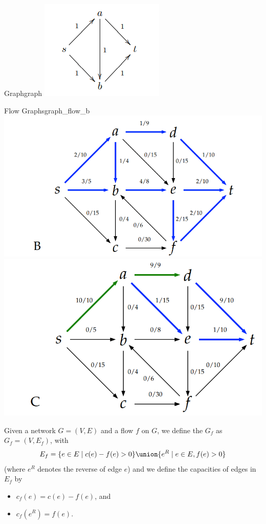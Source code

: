 \documentclass{tufte-handout}
\begin{document}
\begin{questions}
\begin{model}{Graph}{graph}
\includegraphics{Flow_POGIL_1.png}
\label{graph1}
\end{model}

\begin{model}{Flow Graphs}{graph_flow_b}
\includegraphics[scale=.68]{Flow_POGIL_2.png}
\includegraphics[scale=.68]{Flow_POGIL_3.png}
\label{graph_flow_b}
\end{model}

\begin{defn}
  Given a network $G=(V,E)$ and a flow $f$ on $G$, we define the
   $G_{f}$ as $G_{f}=(V,E_f)$, with
  \[ E_f = \{ e \in E \mid c(e) - f(e) > 0 \} \union \{ e^R \mid e \in
    E, f(e) > 0 \} \] (where $e^R$ denotes the reverse of edge $e$)
  and we define the capacities of edges in $E_f$ by
  \begin{itemize}
  \item $c_{f}(e)=c(e)-f(e)$, and
  \item $c_{f}(e^{R}) = f(e)$.
  \end{itemize}
\end{defn}


\end{questions}
\end{document}
